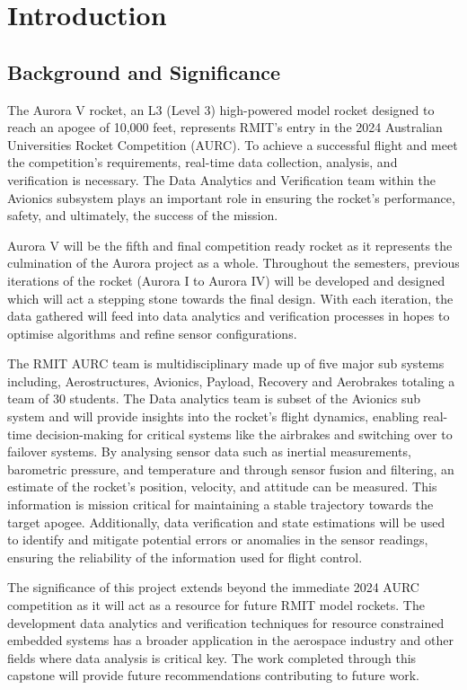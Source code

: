 \section{Introduction}
\subsection{Background and Significance}
The Aurora V rocket, an L3 (Level 3) high-powered model rocket designed to reach an apogee of 10,000 feet, represents RMIT's entry in the 2024 Australian Universities Rocket Competition (AURC). To achieve a successful flight and meet the competition's requirements, real-time data collection, analysis, and verification is necessary. The Data Analytics and Verification team within the Avionics subsystem plays an important role in ensuring the rocket's performance, safety, and ultimately, the success of the mission. 

Aurora V will be the fifth and final competition ready rocket as it represents the culmination of the Aurora project as a whole. Throughout the semesters, previous iterations of the rocket (Aurora I to Aurora IV) will be developed and designed which will act a stepping stone towards the final design. With each iteration, the data gathered will feed into data analytics and verification processes in hopes to optimise algorithms and refine sensor configurations.  

The RMIT AURC team is multidisciplinary made up of five major sub systems including, Aerostructures, Avionics, Payload, Recovery and Aerobrakes totaling a team of 30 students. The Data analytics team is subset of the Avionics sub system and will provide insights into the rocket's flight dynamics, enabling real-time decision-making for critical systems like the airbrakes and switching over to failover systems. By analysing sensor data such as inertial measurements, barometric pressure, and temperature and through sensor fusion and filtering, an estimate of the rocket's position, velocity, and attitude can be measured. This information is mission critical for maintaining a stable trajectory towards the target apogee. Additionally, data verification and state estimations will be used to identify and mitigate potential errors or anomalies in the sensor readings, ensuring the reliability of the information used for flight control. 

The significance of this project extends beyond the immediate 2024 AURC competition as it will act as a resource for future RMIT model rockets. The development data analytics and verification techniques for resource constrained embedded systems has a broader application in the aerospace industry and other fields where data analysis is critical key. The work completed through this capstone will provide future recommendations contributing to future work.  


